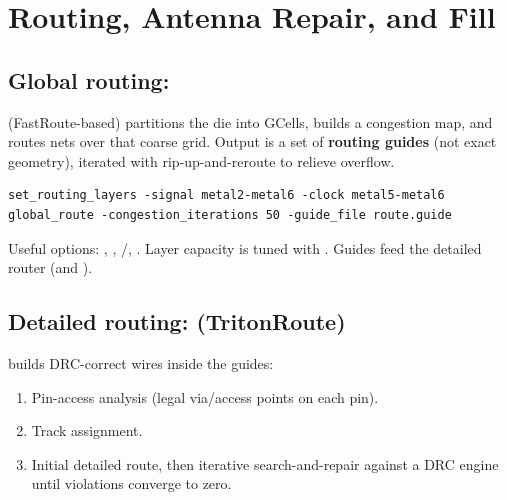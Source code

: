 \chapter{Routing, Antenna Repair, and Fill}
\label{ch:route}


\section{Global routing: }

 (FastRoute-based) partitions the die into GCells,
builds a congestion map, and routes nets over that coarse grid. Output is a
set of \textbf{routing guides} (not exact geometry), iterated with
rip-up-and-reroute to relieve overflow.

\begin{lstlisting}[style=ortcl]
set_routing_layers -signal metal2-metal6 -clock metal5-metal6
global_route -congestion_iterations 50 -guide_file route.guide
\end{lstlisting}

Useful options: , ,
/, . Layer
capacity is tuned with . Guides
feed the detailed router (and ).

\section{Detailed routing:  (TritonRoute)}

 builds DRC-correct wires inside the guides:

\begin{enumerate}
  \item Pin-access analysis (legal via/access points on each pin).
  \item Track assignment.
  \item Initial detailed route, then iterative search-and-repair against a DRC
        engine until violations converge to zero.
\end{enumerate}

